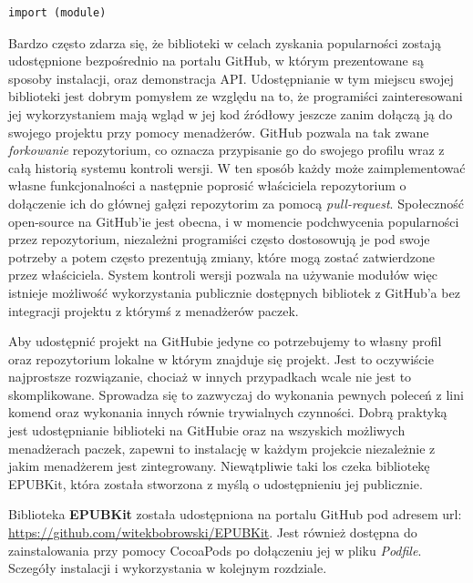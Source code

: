 \begin{lstlisting}[language=swift-reference,caption={Sposób importowania dodatkowego modułu},label=import]
import (module)
\end{lstlisting}

Bardzo często zdarza się, że biblioteki w celach zyskania popularności zostają udostępnione bezpośrednio na portalu GitHub, w którym prezentowane są sposoby instalacji, oraz demonstracja API. Udostępnianie w tym miejscu swojej biblioteki jest dobrym pomysłem ze względu na to, że programiści zainteresowani jej wykorzystaniem mają wgląd w jej kod źródłowy jeszcze zanim dołączą ją do swojego projektu przy pomocy menadżerów. GitHub pozwala na tak zwane \textit{forkowanie} repozytorium, co oznacza przypisanie go do swojego profilu wraz z całą historią systemu kontroli wersji. W ten sposób każdy może zaimplementować własne funkcjonalności a następnie poprosić właściciela repozytorium o dołączenie ich do głównej gałęzi repozytorim za pomocą \textit{pull-request}. Społeczność open-source na GitHub'ie jest obecna, i w momencie podchwycenia popularności przez repozytorium, niezależni programiści często dostosowują je pod swoje potrzeby a potem często prezentują zmiany, które mogą zostać zatwierdzone przez właściciela. System kontroli wersji pozwala na używanie modułów więc istnieje możliwość wykorzystania publicznie dostępnych bibliotek z GitHub'a bez integracji projektu z którymś z menadżerów paczek.

Aby udostępnić projekt na GitHubie jedyne co potrzebujemy to własny profil oraz repozytorium lokalne w którym znajduje się projekt. Jest to oczywiście najprostsze rozwiązanie, chociaż w innych przypadkach wcale nie jest to skomplikowane. Sprowadza się to zazwyczaj do wykonania pewnych poleceń z lini komend oraz wykonania innych równie trywialnych czynności. Dobrą praktyką jest udostępnianie biblioteki na GitHubie oraz na wszyskich możliwych menadżerach paczek, zapewni to instalację w każdym projekcie niezależnie z jakim menadżerem jest zintegrowany. Niewątpliwie taki los czeka bibliotekę EPUBKit, która została stworzona z myślą o udostępnieniu jej publicznie.

Biblioteka \textbf{EPUBKit} została udostępniona na portalu GitHub pod adresem url: \url{https://github.com/witekbobrowski/EPUBKit}. Jest również dostępna do zainstalowania przy pomocy CocoaPods po dołączeniu jej w pliku \textit{Podfile}. Sczegóły instalacji i wykorzystania w kolejnym rozdziale.
